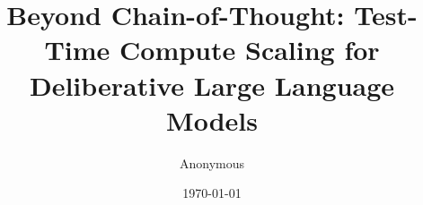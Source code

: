 \usepackage[margin=1in]{geometry}
\usepackage[T1]{fontenc}
\usepackage{lmodern}
\usepackage{amsmath, amssymb, amsthm, mathtools}
\usepackage{bm}
\usepackage{microtype}
\usepackage{hyperref}
\usepackage{enumitem}
\usepackage{thmtools}
\usepackage{graphicx}
\usepackage{booktabs}
\usepackage[numbers,sort&compress]{natbib}
\usepackage{algorithm}
\usepackage{algorithmic}
\usepackage{pgfplots}
\usepackage{pgfplotstable}
\usepackage{adjustbox}
\usepackage{longtable}
\pgfplotsset{compat=1.18}
\usepackage{xcolor}
\usepackage{caption}
\usepackage{subcaption}
\usepackage{siunitx}
\usepackage{array}
\usepackage{etoolbox}
\usepackage{placeins}
\usepackage{setspace}
\usepackage{titling}
\usepackage{url}
\usepackage{float}
\usepackage{tikz}
\usetikzlibrary{fillbetween}
\hypersetup{colorlinks=true, linkcolor=blue, citecolor=blue, urlcolor=blue}


\newcommand{\E}{\mathbb{E}}
\newcommand{\Prob}{\mathbb{P}}
\newcommand{\Var}{\mathrm{Var}}
\newcommand{\KL}{D_{\mathrm{KL}}}
\newcommand{\1}{\mathbb{I}}
\newcommand{\R}{\mathbb{R}}

\title{\textbf{Beyond Chain-of-Thought: Test-Time Compute Scaling for Deliberative Large Language Models}}
\author{Anonymous}
\date{\today}


\maketitle

